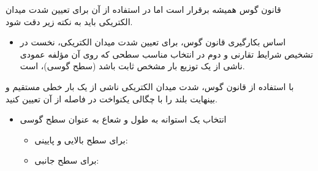 \begin{ELremark}{}

قانون گوس همیشه برقرار است اما در استفاده از آن برای تعیین شدت میدان الکتریکی باید به نکته زیر دقت شود.

\begin{itemize}
\tightlist
\item
  اساس بکارگیری قانون گوس، برای تعیین شدت میدان الکتریکی، نخست در تشخیص شرایط تقارنی و دوم در انتخاب مناسب سطحی که روی آن مؤلفه عمودی  ناشی از یک توزیع بار مشخص ثابت باشد (سطح گوسی)، است.
\end{itemize}

\end{ELremark}


\begin{ELexample}{}

با استفاده از قانون گوس، شدت میدان الکتریکی ناشی از یک بار خطی مستقیم و بینهایت بلند را با چگالی یکنواخت \ELim{\rho_\ell} در فاصله  از آن تعیین کنید.


\begin{ELsolution}


\begin{itemize}
\tightlist
\item
  انتخاب یک استوانه به طول  و شعاع  به عنوان سطح گوسی

  \begin{itemize}
  \tightlist
  \item
    برای سطح بالایی و پایینی: 
  \item
    برای سطح جانبی: 
  \end{itemize}
\end{itemize}


\end{ELsolution}

\end{ELexample}


